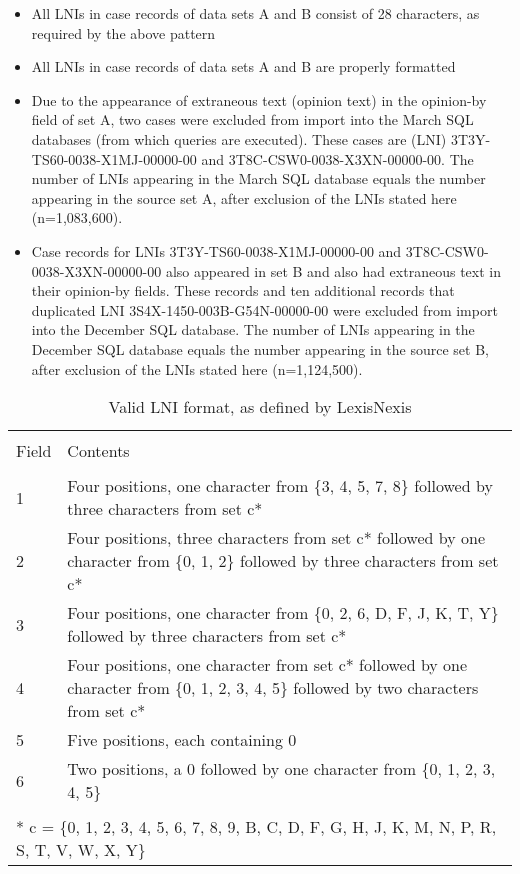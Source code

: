 \documentclass[10pt, letterpaper]{article}
\begin{document}
\begin{spacing}{1.0}
\begin{itemize}\setlength\itemsep{1pt}
  \item All LNIs in case records of data sets A and B consist of 28 characters, as required by the above pattern
  \item All LNIs in case records of data sets A and B are properly formatted
  \item Due to the appearance of extraneous text (opinion text) in the opinion-by field of set A, two cases were excluded from import into the March SQL databases (from which queries are executed).  These cases are (LNI) 3T3Y-TS60-0038-X1MJ-00000-00 and 3T8C-CSW0-0038-X3XN-00000-00.  The number of LNIs appearing in the March SQL database equals the number appearing in the source set A, after exclusion of the LNIs stated here (n=1,083,600).
  \item Case records for LNIs 3T3Y-TS60-0038-X1MJ-00000-00 and 3T8C-CSW0-0038-X3XN-00000-00 also appeared in set B and also had extraneous text in their opinion-by fields.  These records and ten additional records that duplicated LNI 3S4X-1450-003B-G54N-00000-00 were excluded from import into the December SQL database.  The number of LNIs appearing in the December SQL database equals the number appearing in the source set B, after exclusion of the LNIs stated here (n=1,124,500).
\end{itemize}

\begin{table}[H]
    \centering
    \caption{Valid LNI format, as defined by LexisNexis}
    \small
    \begin{tabular}{p{0.25in}p{6in}}
        \hline\\[-6pt]
        Field & Contents\\[4pt]
        \hline\\[-6pt]
        1 & Four positions, one character from \{3, 4, 5, 7, 8\} followed by three characters from set c*\\
        2 & Four positions, three characters from set c* followed by one character from \{0, 1, 2\} followed by three characters from set c*\\
        3 & Four positions, one character from \{0, 2, 6, D, F, J, K, T, Y\} followed by three characters from set c*\\
        4 & Four positions, one character from set c* followed by one character from \{0, 1, 2, 3, 4, 5\} followed by two characters from set c*\\
        5 & Five positions, each containing 0\\
        6 & Two positions, a 0 followed by one character from \{0, 1, 2, 3, 4, 5\}\\[4pt]
        \hline\\[-6pt]
        \multicolumn{2}{l}{* c = \{0, 1, 2, 3, 4, 5, 6, 7, 8, 9, B, C, D, F, G, H, J, K, M, N, P, R, S, T, V, W, X, Y\}}\\
    \end{tabular}
    \label{tab:LNIField}
\end{table}


\end{spacing}
\end{document}

